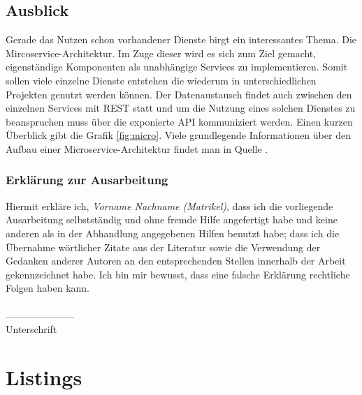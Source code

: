 \documentclass[fleqn,10.5pt,ngerman]{SelfArx}
\begin{document}
\subsection{Ausblick}
 Gerade das Nutzen schon vorhandener Dienste birgt ein interessantes Thema. Die Mircoservice-Architektur. Im Zuge dieser wird es sich zum Ziel gemacht, eigenständige Komponenten als unabhängige Services zu implementieren. Somit sollen viele einzelne Dienste entstehen die wiederum in unterschiedlichen Projekten genutzt werden können. Der Datenaustausch findet auch zwischen den einzelnen Services mit REST statt und um die Nutzung eines solchen Dienstes zu beanspruchen muss über die exponierte API kommuniziert werden. Einen kurzen Überblick gibt die Grafik \ref{fig:micro}.
Viele grundlegende Informationen über den Aufbau einer Microservice-Architektur findet man in Quelle \cite{microservice}. 
\newpage
\clearpage
\appendix
\cleardoublepage
\onecolumn





\subsubsection*{Erklärung zur Ausarbeitung}
Hiermit erkläre ich, {\it Vorname Nachname (Matrikel)}, dass ich die vorliegende Ausarbeitung selbstständig und ohne fremde Hilfe angefertigt habe und keine anderen als in der Abhandlung angegebenen Hilfen benutzt habe; dass ich die Übernahme wörtlicher Zitate aus der Literatur sowie die Verwendung der Gedanken anderer Autoren an den entsprechenden Stellen innerhalb der Arbeit gekennzeichnet habe. Ich bin mir bewusst, dass eine falsche Erklärung rechtliche Folgen haben kann.\\ \\
--------------------- \\
Unterschrift


\clearpage
\appendix
\cleardoublepage
\newpage
\onecolumn

\section{Listings}

\newpage

\newpage

\end{document}

